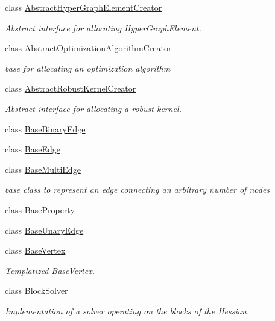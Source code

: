 \begin{DoxyCompactItemize}
\item 
class \hyperlink{classg2o_1_1AbstractHyperGraphElementCreator}{Abstract\+Hyper\+Graph\+Element\+Creator}
\begin{DoxyCompactList}\small\item\em Abstract interface for allocating Hyper\+Graph\+Element. \end{DoxyCompactList}\item 
class \hyperlink{classg2o_1_1AbstractOptimizationAlgorithmCreator}{Abstract\+Optimization\+Algorithm\+Creator}
\begin{DoxyCompactList}\small\item\em base for allocating an optimization algorithm \end{DoxyCompactList}\item 
class \hyperlink{classg2o_1_1AbstractRobustKernelCreator}{Abstract\+Robust\+Kernel\+Creator}
\begin{DoxyCompactList}\small\item\em Abstract interface for allocating a robust kernel. \end{DoxyCompactList}\item 
class \hyperlink{classg2o_1_1BaseBinaryEdge}{Base\+Binary\+Edge}
\item 
class \hyperlink{classg2o_1_1BaseEdge}{Base\+Edge}
\item 
class \hyperlink{classg2o_1_1BaseMultiEdge}{Base\+Multi\+Edge}
\begin{DoxyCompactList}\small\item\em base class to represent an edge connecting an arbitrary number of nodes \end{DoxyCompactList}\item 
class \hyperlink{classg2o_1_1BaseProperty}{Base\+Property}
\item 
class \hyperlink{classg2o_1_1BaseUnaryEdge}{Base\+Unary\+Edge}
\item 
class \hyperlink{classg2o_1_1BaseVertex}{Base\+Vertex}
\begin{DoxyCompactList}\small\item\em Templatized \hyperlink{classg2o_1_1BaseVertex}{Base\+Vertex}. \end{DoxyCompactList}\item 
class \hyperlink{classg2o_1_1BlockSolver}{Block\+Solver}
\begin{DoxyCompactList}\small\item\em Implementation of a solver operating on the blocks of the Hessian. \end{DoxyCompactList}\item 

\end{DoxyCompactItemize}
